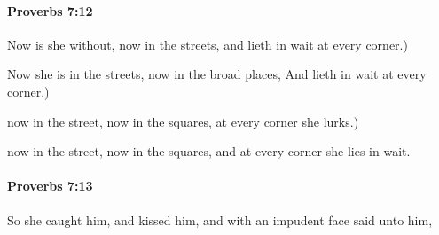 		\paragraph{Proverbs 7:12} %
			\label{PROVERBS-7-12}

			Now is she without, now in the streets, and lieth in wait at every corner.)

			\begin{versebox}
					\item[BHS] 
					\item[ASV] Now she is in the streets, now in the broad places, And lieth in wait at every corner.)
					\item[NIV] now in the street, now in the squares, at every corner she lurks.)
					\item[NRSV] now in the street, now in the squares, and at every corner she lies in wait.
			\end{versebox}

		\paragraph{Proverbs 7:13} %
			\label{PROVERBS-7-13}

			So she caught him, and kissed him, and with an impudent face said unto him,

